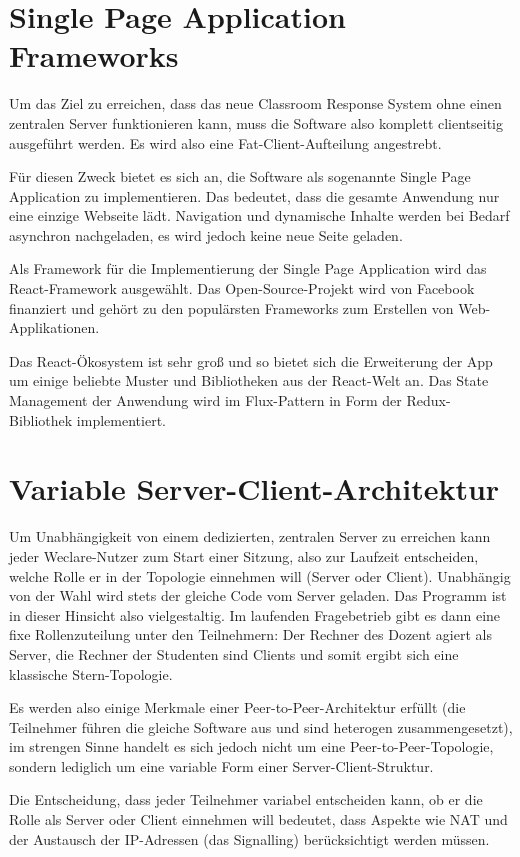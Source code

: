 \section{Single Page Application Frameworks}
\label{chap:validierung}
Um das Ziel zu erreichen, dass das neue Classroom Response System ohne einen zentralen Server funktionieren kann, muss die Software also komplett clientseitig ausgeführt werden. Es wird also eine Fat-Client-Aufteilung angestrebt.

Für diesen Zweck bietet es sich an, die Software als sogenannte Single Page Application zu implementieren. Das bedeutet, dass die gesamte Anwendung nur eine einzige Webseite lädt. Navigation und dynamische Inhalte werden bei Bedarf asynchron nachgeladen, es wird jedoch keine neue Seite geladen.

Als Framework für die Implementierung der Single Page Application wird das React-Framework ausgewählt. Das Open-Source-Projekt wird von Facebook finanziert und gehört zu den populärsten Frameworks zum Erstellen von Web-Applikationen.

Das React-Ökosystem ist sehr groß und so bietet sich die Erweiterung der App um einige beliebte Muster und Bibliotheken aus der React-Welt an. Das State Management der Anwendung wird im Flux-Pattern in Form der Redux-Bibliothek implementiert.


%
\section{Variable Server-Client-Architektur}
\label{chap:p2p}
Um Unabhängigkeit von einem dedizierten, zentralen Server zu erreichen kann jeder Weclare-Nutzer zum Start einer Sitzung, also zur Laufzeit entscheiden, welche Rolle er in der Topologie einnehmen will (Server oder Client). Unabhängig von der Wahl wird stets der gleiche Code vom Server geladen. Das Programm ist in dieser Hinsicht also vielgestaltig. Im laufenden Fragebetrieb gibt es dann eine fixe Rollenzuteilung unter den Teilnehmern: Der Rechner des Dozent agiert als Server, die Rechner der Studenten sind Clients und somit ergibt sich eine klassische Stern-Topologie.

Es werden also einige Merkmale einer Peer-to-Peer-Architektur erfüllt (die Teilnehmer führen die gleiche Software aus und sind heterogen zusammengesetzt), im strengen Sinne handelt es sich jedoch nicht um eine Peer-to-Peer-Topologie, sondern lediglich um eine variable Form einer Server-Client-Struktur.

Die Entscheidung, dass jeder Teilnehmer variabel entscheiden kann, ob er die Rolle als Server oder Client einnehmen will bedeutet, dass Aspekte wie NAT und der Austausch der IP-Adressen (das Signalling) berücksichtigt werden müssen.

